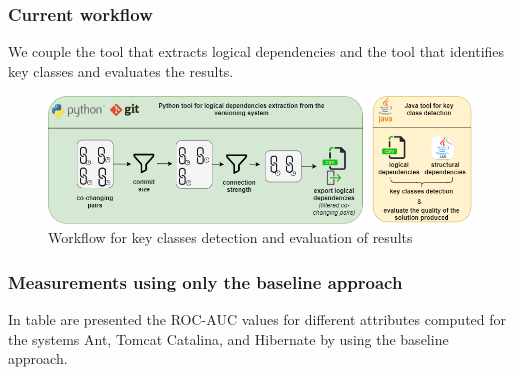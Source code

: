 \documentclass{beamer}
\begin{document}

 \begin{frame}
\frametitle{Current workflow}
We couple the tool that extracts logical dependencies and the tool that identifies key classes and evaluates the results.
 \begin{center}
     \begin{figure}
	\includegraphics[scale=0.4]{key_class_workflow.png}
	\caption{\label{fig:fig}Workflow for key classes detection and evaluation of results}
     \end{figure}
\end{center}
\end{frame}


 \begin{frame}
\frametitle{Measurements using only the baseline approach}
In table are presented the ROC-AUC values for different attributes computed for the systems Ant, Tomcat Catalina, and Hibernate by using the baseline approach.
  \begin{center}
\begin{table}[!h]
\renewcommand{\arraystretch}{1}
\caption{ROC-AUC metric values extracted. }
\label{tab:previousresults}
\centering
{}
\end{table}
\end{center}
\end{frame}
\end{document}
